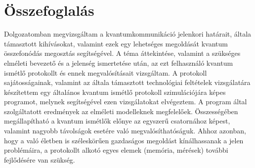 \chapter{Összefoglalás}

Dolgozatomban megvizsgáltam a kvantumkommunikáció jelenkori határait, általa támasztott kihívásokat, valamint ezek egy lehetséges megoldását kvantum összefonódás megosztás segítségével. A téma áttekintése, valamint a szükséges elméleti bevezető és a jelenség ismertetése után, az ezt felhasználó kvantum ismétlő protokollt és ennek megvalósításait vizsgáltam. A protokoll sajátosságainak, valamint az általa támasztott technológiai feltételek vizsgálatára készítettem egy általános kvantum ismétlő protokoll szimulációjára képes programot, melynek segítségével ezen vizsgálatokat elvégeztem. A program által szolgáltatott eredmények az elméleti modelleknek megfelelőek. Összességében megállapítható a kvantum ismétlők előnye az egyszerű csatornához képest, valamint nagyobb távolságok esetére való megvalósíthatóságuk. Ahhoz azonban, hogy a való életben is széleskörűen gazdaságos megoldást kínálhassanak a jelen problémáira, a protokollt alkotó egyes elemek (memória, mérések) további fejlődésére van szükség.
